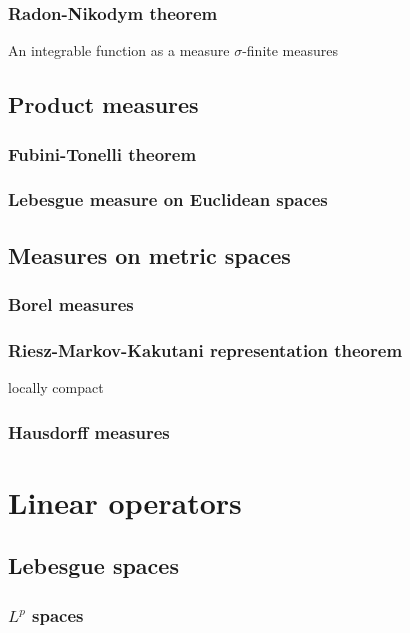 \documentclass{../../large}
\begin{document}
\section{Radon-Nikodym theorem}

An integrable function as a measure
$\sigma$-finite measures




\chapter{Product measures}
\section{Fubini-Tonelli theorem}
\section{Lebesgue measure on Euclidean spaces}


\chapter{Measures on metric spaces}
\section{Borel measures}

\section{Riesz-Markov-Kakutani representation theorem}

locally compact

\section{Hausdorff measures}









\part{Linear operators}



\chapter{Lebesgue spaces}
\section{$L^p$ spaces}
\end{document}
